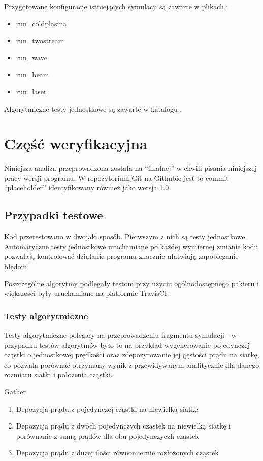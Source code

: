 {    Przygotowane konfiguracje istniejących symulacji są zawarte w plikach : 
    \begin{itemize}
        \item run\_coldplasma
        \item run\_twostream
        \item run\_wave
        \item run\_beam
        \item run\_laser
    \end{itemize}

    Algorytmiczne testy jednostkowe są zawarte w katalogu .

\section[Weryfikacja]{Część weryfikacyjna} %
    Niniejsza analiza przeprowadzona została na ``finalnej'' w chwili pisania niniejszej pracy wersji programu.
    W repozytorium Git na Githubie jest to commit ``placeholder'' 
    identyfikowany również jako wersja 1.0.

    \subsection{Przypadki testowe}

    Kod przetestowano w dwojaki sposób. Pierwszym z nich są testy jednostkowe.
    Automatyczne testy jednostkowe uruchamiane po każdej wymiernej zmianie kodu
    pozwalają kontrolować działanie programu znacznie ułatwiają zapobieganie
    błędom.

    Poszczególne algorytmy podlegały testom przy użyciu ogólnodostępnego
    pakietu   i większości były
    uruchamiane na platformie TravisCI.

    \subsubsection{Testy algorytmiczne}
    Testy algorytmiczne polegały na przeprowadzeniu fragmentu symulacji - w
    przypadku testów algorytmów było to na przykład wygenerowanie pojedynczej
    cząstki o jednostkowej prędkości oraz zdepozytowanie jej gęstości prądu na
    siatkę, co pozwala porównać otrzymany wynik z przewidywanym analitycznie
    dla danego rozmiaru siatki i położenia cząstki. 
    \begin{enumerate}
        \itemi Gather
            \begin{enumerate}
                \item Depozycja prądu z pojedynczej cząstki na niewielką siatkę
                \item Depozycja prądu z dwóch pojedynczych cząstek na niewielką siatkę
                    i porównanie z sumą prądów dla obu pojedynczyczh cząstek
                \item Depozycja prądu z dużej ilości równomiernie rozłożonych cząstek
            \end{enumerate}


\end{enumerate}}
